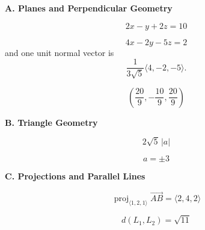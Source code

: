 \documentclass[10pt]{article}
\newcommand{\answerbar}[1]{%
  \vspace{0.55em}%
  \noindent\colorbox{sectiongray}{%
    \parbox{\dimexpr\textwidth-2\fboxsep\relax}{%
      \strut\textbf{#1}\strut
    }%
  }%
  \par\vspace{0.50em}%
}
\begin{document}
\vspace{0.30em}


\answerbar{A. Planes and Perpendicular Geometry}

\begin{parts}

\item
\[
\boxed{2x-y+2z=10}
\]

\item
\[
\boxed{4x-2y-5z=2}
\]
and one unit normal vector is
\[
\boxed{\frac{1}{3\sqrt5}\langle4,-2,-5\rangle}.
\]

\item
\[
\boxed{\left(\frac{20}{9},-\frac{10}{9},\frac{20}{9}\right)}
\]

\end{parts}

\vspace{0.25em}


\answerbar{B. Triangle Geometry}

\begin{parts}

\item
\[
\boxed{2\sqrt5\,|a|}
\]

\item
\[
\boxed{a=\pm3}
\]

\end{parts}

\vspace{0.25em}



\answerbar{C. Projections and Parallel Lines}

\begin{parts}

\item
\[
\boxed{\operatorname{proj}_{\langle1,2,1\rangle}
\overrightarrow{AB}
=\langle2,4,2\rangle}
\]

\item
\[
\boxed{d(L_1,L_2)=\sqrt{11}}
\]

\end{parts}
\end{document}
